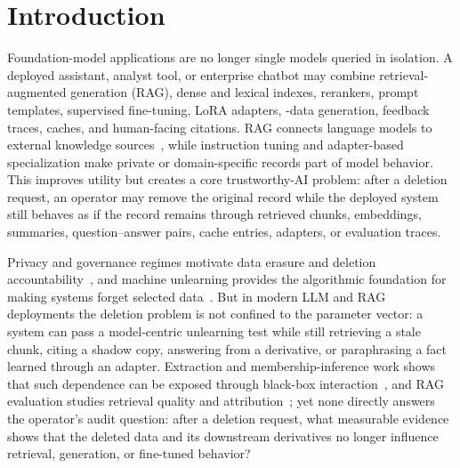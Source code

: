 \section{Introduction}

Foundation-model applications are no longer single models queried in isolation. A deployed assistant, analyst tool, or enterprise chatbot may combine retrieval-augmented generation (RAG), dense and lexical indexes, rerankers, prompt templates, supervised fine-tuning, LoRA adapters, -data generation, feedback traces, caches, and human-facing citations. RAG connects language models to external knowledge sources~\cite{lewis2020rag,karpukhin2020dpr,izacard2021fid,gao2024ragsurvey}, while instruction tuning and adapter-based specialization make private or domain-specific records part of model behavior. This improves utility but creates a core trustworthy-AI problem: after a deletion request, an operator may remove the original record while the deployed system still behaves as if the record remains through retrieved chunks, embeddings, summaries, question--answer pairs, cache entries, adapters, or evaluation traces.

Privacy and governance regimes motivate data erasure and deletion accountability~\cite{voigt2017gdpr,cohen2022deletioncontrol,fan2025fedfmchallenges}, and machine unlearning provides the algorithmic foundation for making systems forget selected data~\cite{cao2015machineunlearning,ginart2019making,bourtoule2021machineunlearning,guo2020certified,maini2024tofu,yao2024largeunlearning,liu2024rethinking,wang2024llmunlearning,jin2024surveyunlearning}. But in modern LLM and RAG deployments the deletion problem is not confined to the parameter vector: a system can pass a model-centric unlearning test while still retrieving a stale chunk, citing a shadow copy, answering from a derivative, or paraphrasing a fact learned through an adapter. Extraction and membership-inference work shows that such dependence can be exposed through black-box interaction~\cite{carlini2019secretsharer,carlini2021extracting,carlini2023quantifying,shokri2017membership,yeom2018privacy,mattern2023membership}, and RAG evaluation studies retrieval quality and attribution~\cite{gao2023retrievalaugmented,asai2024selfrag,yu2024ragevalsurvey,akkiraju2024facts}; yet none directly answers the operator's audit question: after a deletion request, what measurable evidence shows that the deleted data and its downstream derivatives no longer influence retrieval, generation, or fine-tuned behavior?

